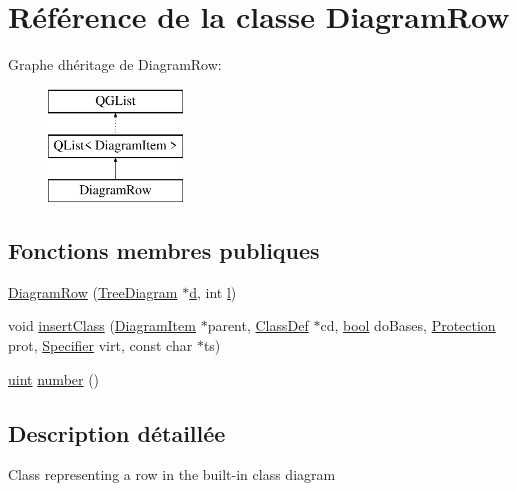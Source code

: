 \hypertarget{class_diagram_row}{}\section{Référence de la classe Diagram\+Row}
\label{class_diagram_row}
Graphe d\textquotesingle{}héritage de Diagram\+Row\+:\begin{figure}[H]
\begin{center}
\leavevmode
\includegraphics[height=3.000000cm]{class_diagram_row}
\end{center}
\end{figure}
\subsection*{Fonctions membres publiques}
\begin{DoxyCompactItemize}
\item 
\hyperlink{class_diagram_row_aebadc42ab37dd863cf4eb4ee6c5914a3}{Diagram\+Row} (\hyperlink{class_tree_diagram}{Tree\+Diagram} $\ast$\hyperlink{060__command__switch_8tcl_af43f4b1f0064a33b2d662af9f06d3a00}{d}, int \hyperlink{060__command__switch_8tcl_aff56f84b49947b84b2a304f51cf8e678}{l})
\item 
void \hyperlink{class_diagram_row_ab0e8fb24c44ac7ff3acedae9fc92674b}{insert\+Class} (\hyperlink{class_diagram_item}{Diagram\+Item} $\ast$parent, \hyperlink{class_class_def}{Class\+Def} $\ast$cd, \hyperlink{qglobal_8h_a1062901a7428fdd9c7f180f5e01ea056}{bool} do\+Bases, \hyperlink{types_8h_a90e352184df58cd09455fe9996cd4ded}{Protection} prot, \hyperlink{types_8h_ab16236bdd10ddf4d73a9847350f0017e}{Specifier} virt, const char $\ast$ts)
\item 
\hyperlink{qglobal_8h_a4d3943ddea65db7163a58e6c7e8df95a}{uint} \hyperlink{class_diagram_row_ad6dbe8c970dc8658a99fa400430758d2}{number} ()
\end{DoxyCompactItemize}


\subsection{Description détaillée}
Class representing a row in the built-\/in class diagram 

